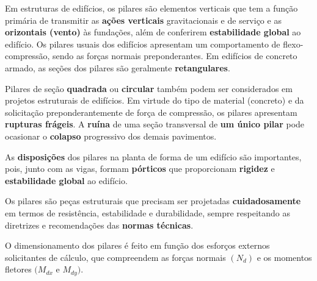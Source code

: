 Em estruturas de edifícios, os pilares são elementos verticais que tem a função primária de transmitir as \textbf{ações verticais} gravitacionais e de serviço e as \textbf{orizontais (vento)} às fundações, além de conferirem \textbf{estabilidade global} ao edifício. Os pilares usuais dos edifícios apresentam um comportamento de flexo-compressão, sendo as forças normais preponderantes.
Em edifícios de concreto armado, as seções dos pilares são geralmente \textbf{retangulares}.


Pilares de seção \textbf{quadrada} ou \textbf{circular} também podem ser considerados em projetos estruturais de edifícios.
Em virtude do tipo de material (concreto) e da solicitação preponderantemente de força de compressão, os pilares apresentam \textbf{rupturas frágeis}. A \textbf{ruína} de uma seção transversal de \textbf{um único pilar} pode ocasionar o \textbf{colapso} progressivo dos demais pavimentos.

As \textbf{disposições} dos pilares na planta de forma de um edifício são importantes, pois, junto com as vigas, formam \textbf{pórticos} que proporcionam \textbf{rigidez} e \textbf{estabilidade global} ao edifício.

Os pilares são peças estruturais que precisam ser projetadas \textbf{cuidadosamente} em termos de resistência, estabilidade e durabilidade, sempre respeitando as diretrizes e recomendações das \textbf{normas técnicas}.

O dimensionamento dos pilares é feito em função dos esforços externos solicitantes de cálculo, que compreendem as forças normais $(N_d)$ e os momentos fletores $(M_{dx}$ e $M_{dy})$.